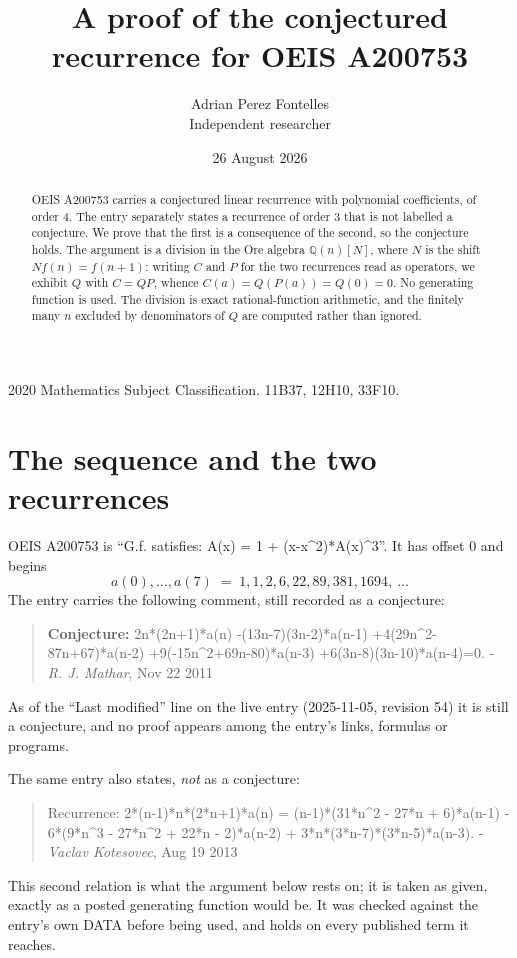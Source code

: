 \documentclass[11pt,a4paper]{article}
\title{A proof of the conjectured recurrence for OEIS A200753}
\author{Adrian Perez Fontelles\\ \small Independent researcher}
\date{26 August 2026}
\theoremstyle{plain}
\theoremstyle{definition}
\begin{document}
\maketitle

\begin{abstract}
OEIS A200753 carries a conjectured linear recurrence with polynomial coefficients, of
order 4. The entry separately states a recurrence of order 3 that is not
labelled a conjecture. We prove that the first is a consequence of the second, so the
conjecture holds. The argument is a division in the Ore algebra
$\mathbb{Q}(n)[N]$, where $N$ is the shift $Nf(n)=f(n+1)$: writing $C$ and $P$ for the two
recurrences read as operators, we exhibit $Q$ with $C=QP$, whence
$C(a)=Q(P(a))=Q(0)=0$. No generating function is used. The division is exact
rational-function arithmetic, and the finitely many $n$ excluded by denominators of $Q$
are computed rather than ignored.
\end{abstract}

\noindent\small 2020 Mathematics Subject Classification. 11B37, 12H10, 33F10.\normalsize

\section{The sequence and the two recurrences}

OEIS A200753 is ``G.f. satisfies: A(x) = 1 + (x-x\^{}2)*A(x)\^{}3''. It has offset $0$ and begins
\[
a(0),\dots,a(7)\;=\;1, 1, 2, 6, 22, 89, 381, 1694,\ \dots
\]
The entry carries the following comment, still recorded as a conjecture:
\begin{quote}\small
\textbf{Conjecture:} 2n*(2n+1)*a(n) -(13n-7)(3n-2)*a(n-1) +4(29n\^{}2-87n+67)*a(n-2) +9(-15n\^{}2+69n-80)*a(n-3) +6(3n-8)(3n-10)*a(n-4)=0. - \emph{R. J. Mathar}, Nov 22 2011
\end{quote}
As of the ``Last modified'' line on the live entry (2025-11-05, revision 54) it is still
a conjecture, and no proof appears among the entry's links, formulas or programs.

The same entry also states, \emph{not} as a conjecture:
\begin{quote}\small
Recurrence: 2*(n-1)*n*(2*n+1)*a(n) = (n-1)*(31*n\^{}2 - 27*n + 6)*a(n-1) - 6*(9*n\^{}3 - 27*n\^{}2 + 22*n - 2)*a(n-2) + 3*n*(3*n-7)*(3*n-5)*a(n-3). - \emph{Vaclav Kotesovec}, Aug 19 2013
\end{quote}
This second relation is what the argument below rests on; it is taken as given, exactly as
a posted generating function would be. It was checked against the entry's own DATA before
being used, and holds on every published term it reaches.
\end{document}
